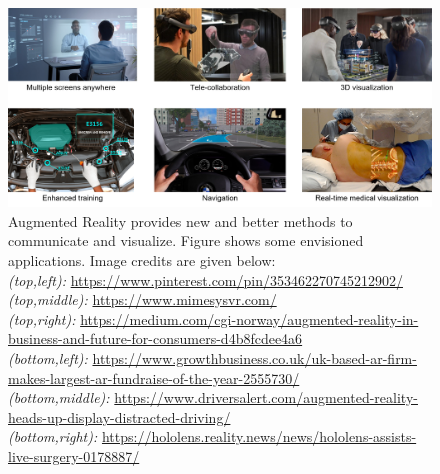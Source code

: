 \begin{figure}[h!]
\centering
\includegraphics[width=\columnwidth]{images/other/motivation}
\caption[Motivation for Augmented Reality]{Augmented Reality provides new and better methods to communicate and visualize. 
Figure shows some envisioned applications. Image credits are given below:\\
\footnotesize
\emph{(top,left):} \href{https://www.pinterest.com/pin/353462270745212902/}{https://www.pinterest.com/pin/353462270745212902/}\\
\emph{(top,middle):} \href{https://www.mimesysvr.com/}{https://www.mimesysvr.com/}\\
\emph{(top,right):} \href{https://medium.com/cgi-norway/augmented-reality-in-business-and-future-for-consumers-d4b8fcdee4a6}{https://medium.com/cgi-norway/augmented-reality-in-business-and-future-for-consumers-d4b8fcdee4a6}\\
\emph{(bottom,left):} \href{https://www.growthbusiness.co.uk/uk-based-ar-firm-makes-largest-ar-fundraise-of-the-year-2555730/}{https://www.growthbusiness.co.uk/uk-based-ar-firm-makes-largest-ar-fundraise-of-the-year-2555730/}\\
\emph{(bottom,middle):} \href{https://www.driversalert.com/augmented-reality-heads-up-display-distracted-driving/}{https://www.driversalert.com/augmented-reality-heads-up-display-distracted-driving/}\\
\emph{(bottom,right):} \href{https://hololens.reality.news/news/hololens-assists-live-surgery-0178887/}{https://hololens.reality.news/news/hololens-assists-live-surgery-0178887/}\\
}
\end{figure}
